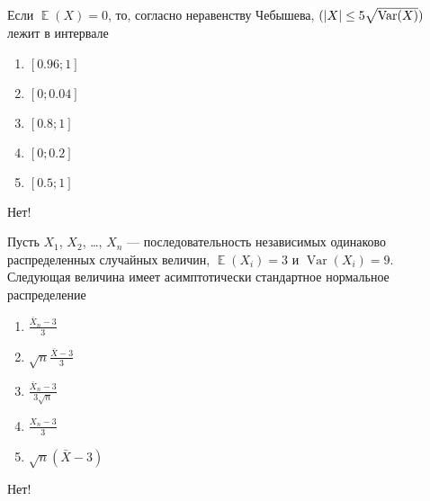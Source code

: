 \documentclass[t]{beamer}
\DeclareMathOperator{\Var}{Var}
\DeclareMathOperator{\E}{\mathbb{E}}
\let\P\relax
\DeclareMathOperator{\P}{\mathbb{P}}
\begin{document}
 \begin{frame} \label{27-No} 
\begin{block}{27} 

Если $\E(X)=0$, то, согласно неравенству Чебышева, $\P(|X| \leq 5 \sqrt{\Var(X)})$ лежит в интервале
 


 \end{block} 
\begin{enumerate} 
\item[] \hyperlink{27-Yes}{\beamergotobutton{} $[0.96;1]$ }
\item[] \hyperlink{27-No}{\beamergotobutton{} $[0;0.04]$}
\item[] \hyperlink{27-No}{\beamergotobutton{} $[0.8;1]$}
\item[] \hyperlink{27-No}{\beamergotobutton{} $[0;0.2]$}
\item[] \hyperlink{27-No}{\beamergotobutton{} $[0.5;1]$
}
\end{enumerate} 

 \alert{Нет!} 
\end{frame} 


 \begin{frame} \label{28-No} 
\begin{block}{28} 

Пусть $X_1$, $X_2$, \ldots, $X_n$ — последовательность независимых одинаково распределенных случайных величин, $\E(X_i)=3$ и $\Var(X_i)=9$. Следующая величина имеет асимптотически стандартное нормальное распределение
 


 \end{block} 
\begin{enumerate} 
\item[] \hyperlink{28-No}{\beamergotobutton{} $\frac{\bar{X}_n-3}{3}$}
\item[] \hyperlink{28-Yes}{\beamergotobutton{} $\sqrt{n}\frac{\bar{X}-3}{3}$}
\item[] \hyperlink{28-No}{\beamergotobutton{} $\frac{\bar{X}_n-3}{3\sqrt{n}}$}
\item[] \hyperlink{28-No}{\beamergotobutton{} $\frac{X_n-3}{3}$ }
\item[] \hyperlink{28-No}{\beamergotobutton{} $\sqrt{n}(\bar{X}-3)$ }
\end{enumerate} 

 \alert{Нет!} 
\end{frame} 
\end{document}
